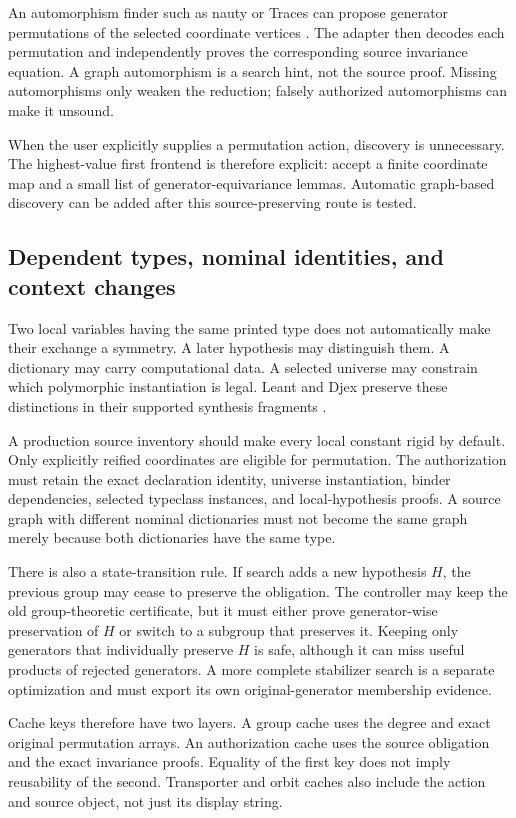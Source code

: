 An automorphism finder such as nauty or Traces can propose generator permutations of the selected coordinate vertices \cite{nauty}. The adapter then decodes each permutation and independently proves the corresponding source invariance equation. A graph automorphism is a search hint, not the source proof. Missing automorphisms only weaken the reduction; falsely authorized automorphisms can make it unsound.

When the user explicitly supplies a permutation action, discovery is unnecessary. The highest-value first frontend is therefore explicit: accept a finite coordinate map and a small list of generator-equivariance lemmas. Automatic graph-based discovery can be added after this source-preserving route is tested.

\subsection{Dependent types, nominal identities, and context changes}
Two local variables having the same printed type does not automatically make their exchange a symmetry. A later hypothesis may distinguish them. A dictionary may carry computational data. A selected universe may constrain which polymorphic instantiation is legal. Leant and Djex preserve these distinctions in their supported synthesis fragments \cite{leant,djex}.

A production source inventory should make every local constant rigid by default. Only explicitly reified coordinates are eligible for permutation. The authorization must retain the exact declaration identity, universe instantiation, binder dependencies, selected typeclass instances, and local-hypothesis proofs. A source graph with different nominal dictionaries must not become the same graph merely because both dictionaries have the same type.

There is also a state-transition rule. If search adds a new hypothesis $H$, the previous group may cease to preserve the obligation. The controller may keep the old group-theoretic certificate, but it must either prove generator-wise preservation of $H$ or switch to a subgroup that preserves it. Keeping only generators that individually preserve $H$ is safe, although it can miss useful products of rejected generators. A more complete stabilizer search is a separate optimization and must export its own original-generator membership evidence.

Cache keys therefore have two layers. A group cache uses the degree and exact original permutation arrays. An authorization cache uses the source obligation and the exact invariance proofs. Equality of the first key does not imply reusability of the second. Transporter and orbit caches also include the action and source object, not just its display string.

